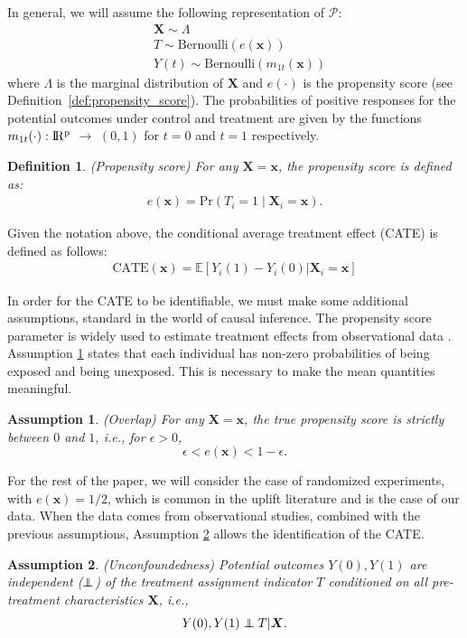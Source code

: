 \documentclass{article}
\newcommand\independent{\protect\mathpalette{\protect\independenT}{\perp}}
\def\independenT#1#2{\mathrel{\rlap{$#1#2$}\mkern2mu{#1#2}}}
\def\x{\mathbf x}
\def \real{\rm I\!R}
\newtheorem{definition}{Definition}
\newtheorem{assumption}{Assumption}
\begin{document}
In general, we will assume the following representation of $\mathcal{P}$:
\begin{align*}
 &\boldsymbol X \sim \Lambda\\
 &T \sim \mathrm{Bernoulli}(e(\x))\\
 &Y(t) \sim \mathrm{Bernoulli}(m_{1t}(\x))
\end{align*}
where $\Lambda$ is the marginal distribution of $\boldsymbol X$ and $e(\cdot)$ is the propensity score (see Definition~\ref{def:propensity_score}). The probabilities of positive responses for the potential outcomes under control and treatment are given by the functions $m_{1t}(\cdot):\real^{p}$ $\rightarrow$ $(0,1)$ for $t=0$ and $t=1$ respectively.

\begin{definition}
(Propensity score) For any $\boldsymbol X=\x$, the \textit{propensity score} is defined as: 
\begin{align}
    e(\x)= \mathrm{Pr}(T_i=1 \mid \boldsymbol X_i = \x).
    \label{def:propensity_score}
\end{align}
\end{definition}

Given the notation above, the conditional average treatment effect (CATE) is defined as follows:
\begin{align}
    \mathrm{CATE}(\x) = \mathbb{E}[Y_i(1) - Y_i(0)| \boldsymbol X_i = \x]
    \label{def:cate}
\end{align}

In order for the CATE to be identifiable, we must make some additional assumptions, standard in the world of causal inference. The propensity score parameter is widely used to estimate treatment effects from observational data \citep{rosenbaum1983central}. Assumption \ref{ass:assumption2} states that each individual has non-zero probabilities of being exposed and being unexposed. This is necessary to make the mean quantities meaningful.

\begin{assumption}
(Overlap) For any $\boldsymbol X=\x$, the true propensity score is strictly between $0$ and $1$, i.e., for $\epsilon > 0$,
$$\epsilon < e(\x) < 1-\epsilon.$$
\label{ass:assumption2}
\end{assumption} 

For the rest of the paper, we will consider the case of randomized experiments, with $e(\x)=1/2$, which is common in the uplift literature and is the case of our data. When the data comes from observational studies, combined with the previous assumptions, Assumption \ref{ass:assumption1} allows the identification of the CATE.
\begin{assumption}
(Unconfoundedness) Potential outcomes $Y(0),Y(1)$ are independent ($\independent$) of the treatment assignment indicator $T$ conditioned on all pre-treatment characteristics $\boldsymbol X$, i.e.,
$$Y(0), Y(1)  \independent T | \boldsymbol X. $$
\label{ass:assumption1}
\end{assumption}
\end{document}
